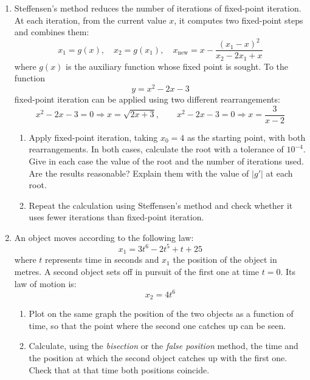 \begin{enumerate}
\item Steffensen's method reduces the number of iterations of fixed-point iteration. At each iteration, from the current value $x$, it computes two fixed-point steps and combines them:
\begin{equation*}
x_1=g(x),\quad x_2=g(x_1),\quad x_{\text{new}} = x - \frac{(x_1 -x)^2}{x_2 - 2x_1 + x}
\end{equation*}
where $g(x)$ is the auxiliary function whose fixed point is sought. To the function
\begin{equation*}
y= x^2-2x-3
\end{equation*}
fixed-point iteration can be applied using two different rearrangements:
\begin{equation*}
x^2-2x-3=0 \Rightarrow x=\sqrt{2x+3}, \qquad x^2-2x-3=0 \Rightarrow x=\frac{3}{x-2}
\end{equation*}
\begin{enumerate}
\item Apply fixed-point iteration, taking $x_0=4$ as the starting point, with both rearrangements. In both cases, calculate the root with a tolerance of $10^{-4}$. Give in each case the value of the root and the number of iterations used. Are the results reasonable? Explain them with the value of $\vert g'\vert$ at each root.
\item Repeat the calculation using Steffensen's method and check whether it uses fewer iterations than fixed-point iteration.
\end{enumerate}

\item An object moves according to the following law:
\begin{equation*}
x_1 = 3t^6 - 2t^5 + t + 25
\end{equation*}
where $t$ represents time in seconds and $x_1$ the position of the object in metres.
A second object sets off in pursuit of the first one at time $t=0$. Its law of motion is:
\begin{equation*}
x_2 = 4t^6
\end{equation*}
\begin{enumerate}
\item Plot on the same graph the position of the two objects as a function of time, so that the point where the second one catches up can be seen.
\item Calculate, using the \emph{bisection} or the \emph{false position} method, the time and the position at which the second object catches up with the first one. Check that at that time both positions coincide.
\end{enumerate}


\end{enumerate}
